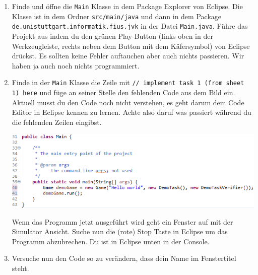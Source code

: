 \begin{enumerate}
    \item Finde und öffne die \texttt{Main} Klasse in dem Package Explorer von Eclipse.
        Die Klasse ist in dem Ordner \texttt{src/main/java} und dann in dem Package \texttt{de.unistuttgart.informatik.fius.jvk} in der Datei \texttt{Main.java}.
        Führe das Projekt aus indem du den grünen Play-Button (links oben in der Werkzeugleiste, rechts neben dem Button mit dem Käfersymbol) von Eclipse drückst. 
        Es sollten keine Fehler auftauchen aber auch nichts passieren.
        Wir haben ja auch noch nichts programmiert.
    \item Finde in der \lstinline{Main} Klasse die Zeile mit \lstinline{// implement task 1 (from sheet 1) here} und füge an seiner Stelle den fehlenden Code aus dem Bild ein.
        Aktuell musst du den Code noch nicht verstehen, es geht darum dem Code Editor in Eclipse kennen zu lernen. 
        Achte also daruf was passiert während du die fehlenden Zeilen eingibst.

        \includegraphics[width=\linewidth]{./figures/code.1.png}

        Wenn das Programm jetzt ausgeführt wird geht ein Fenster auf mit der Simulator Ansicht.
        Suche nun die (rote) Stop Taste in Eclipse um das Programm abzubrechen.
        Du ist in Eclipse unten in der Console.
    \item Versuche nun den Code so zu verändern, dass dein Name im Fenstertitel steht.
\end{enumerate}


